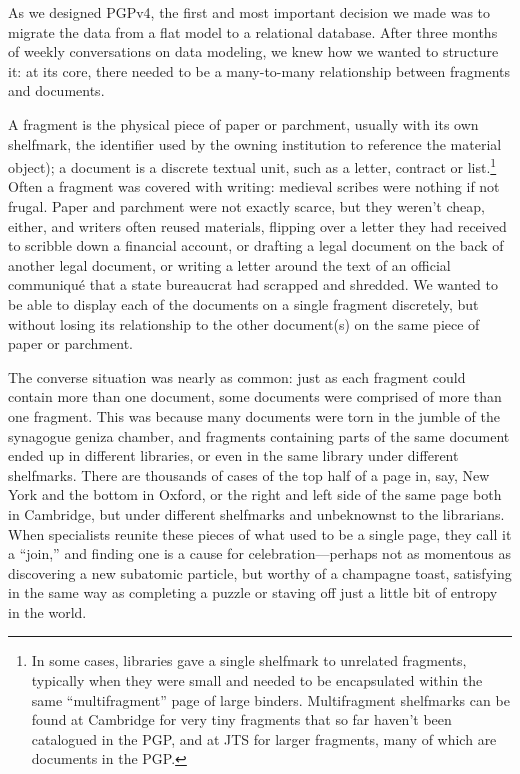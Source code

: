 \documentclass{article}
\begin{document}
As we designed PGPv4, the first and most important decision we made was to migrate the data from a flat model to a relational database. After three months of weekly conversations on data modeling, we knew how we wanted to structure it: at its core, there needed to be a many-to-many relationship between fragments and documents. 

A fragment is the physical piece of paper or parchment, usually with its own shelfmark, the identifier used by the owning institution to reference the material object); a document is a discrete textual unit, such as a letter, contract or list.\footnote{In some cases, libraries gave a single shelfmark to unrelated fragments, typically when they were small and needed to be encapsulated within the same “multifragment” page of large binders. Multifragment shelfmarks can be found at Cambridge for very tiny fragments that so far haven’t been catalogued in the PGP, and at JTS for larger fragments, many of which are documents in the PGP.} Often a fragment was covered with writing: medieval scribes were nothing if not frugal. Paper and parchment were not exactly scarce, but they weren’t cheap, either, and writers often reused materials, flipping over a letter they had received to scribble down a financial account, or drafting a legal document on the back of another legal document, or writing a letter around the text of an official communiqué that a state bureaucrat had scrapped and shredded. We wanted to be able to display each of the documents on a single fragment discretely, but without losing its relationship to the other document(s) on the same piece of paper or parchment. 

The converse situation was nearly as common: just as each fragment could contain more than one document, some documents were comprised of more than one fragment. This was because many documents were torn in the jumble of the synagogue geniza chamber, and fragments containing parts of the same document ended up in different libraries, or even in the same library under different shelfmarks. There are thousands of cases of the top half of a page in, say, New York and the bottom in Oxford, or the right and left side of the same page both in Cambridge, but under different shelfmarks and unbeknownst to the librarians. When specialists reunite these pieces of what used to be a single page, they call it a “join,” and finding one is a cause for celebration—perhaps not as momentous as discovering a new subatomic particle, but worthy of a champagne toast, satisfying in the same way as completing a puzzle or staving off just a little bit of entropy in the world. 
\end{document}
